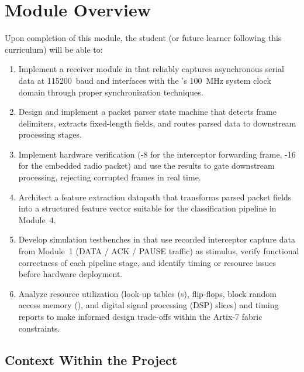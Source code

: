 \documentclass[11pt,letterpaper]{article}
\begin{document}
	\tableofcontents
	\newpage

	\section{Module Overview}

	\begin{tcolorbox}[objective={Module 2 Learning Objectives}]
		Upon completion of this module, the student (or future learner following this curriculum) will be able to:
		\begin{enumerate}[label=\textbf{LO-\arabic*}]
			\item Implement a \UART{} receiver module in \VHDL{} that reliably captures asynchronous serial data at 115200~baud and interfaces with the \FPGA's 100~MHz system clock domain through proper synchronization techniques.
			\item Design and implement a packet parser state machine that detects frame delimiters, extracts fixed-length fields, and routes parsed data to downstream processing stages.
			\item Implement hardware \CRC{} verification (\CRC{}-8 for the interceptor forwarding frame, \CRC{}-16 for the embedded radio packet) and use the results to gate downstream processing, rejecting corrupted frames in real time.
			\item Architect a feature extraction datapath that transforms parsed packet fields into a structured feature vector suitable for the \ML{} classification pipeline in Module~4.
			\item Develop simulation testbenches in \VHDL{} that use recorded interceptor capture data from Module~1 (DATA / ACK / PAUSE traffic) as stimulus, verify functional correctness of each pipeline stage, and identify timing or resource issues before hardware deployment.
			\item Analyze \FPGA{} resource utilization (look-up tables (\LUT{}s), flip-flops, block random access memory (\BRAM{}), and digital signal processing (DSP) slices) and timing reports to make informed design trade-offs within the Artix-7 fabric constraints.
		\end{enumerate}
	\end{tcolorbox}

	\subsection{Context Within the Project}
\end{document}
